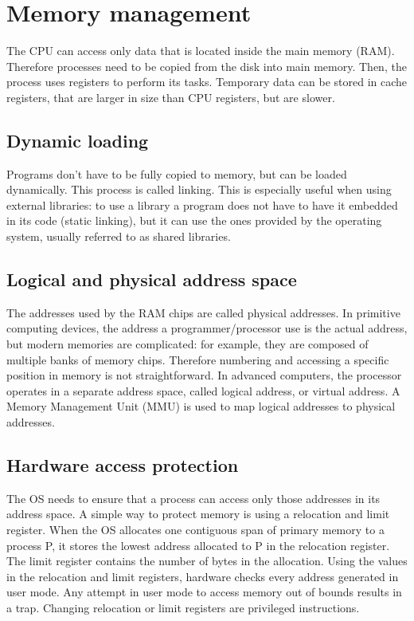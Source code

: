\chapter{Memory management}

The CPU can access only data that is located inside the main memory (RAM). Therefore processes need to be copied from the disk into main memory. Then, the process uses registers to perform its tasks. Temporary data can be stored in cache registers, that are larger in size than CPU registers, but are slower.


\section{Dynamic loading}
Programs don't have to be fully copied to memory, but can be loaded dynamically. This process is called linking. This is especially useful when using external libraries: to use a library a program does not have to have it embedded in its code (static linking), but it can use the ones provided by the operating system, usually referred to as shared libraries.

\section{Logical and physical address space}
The addresses used by the RAM chips are called physical addresses. In primitive computing devices, the address a programmer/processor use is the actual address, but modern memories are complicated: for example, they are composed of multiple banks of memory chips. Therefore numbering and accessing a specific position in memory is not straightforward. In advanced computers, the processor operates in a separate address space, called logical address, or virtual address. A Memory Management Unit (MMU) is used to map logical addresses to physical addresses.


\section{Hardware access protection}
The OS needs to ensure that a process can access only those addresses in its address space. A simple way to protect memory is using a relocation and limit register. When the OS allocates one contiguous span of primary memory to a process P, it stores the lowest address allocated to P in the relocation register. The limit register contains the number of bytes in the allocation. Using the values in the relocation and limit registers, hardware checks every address generated in user mode. Any attempt in user mode to access memory out of bounds results in a trap. Changing relocation or limit registers are privileged instructions.

